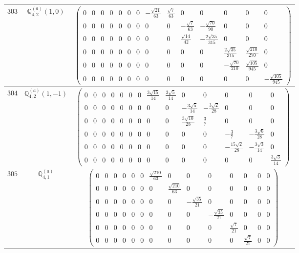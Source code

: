 \documentclass[fleqn,8pt,landscape]{jsarticle}
\begin{document}
\begin{center}
\begin{longtable}{ccc}
$ 303 $ & $ \mathbb{Q}_{4,2}^{(a)}(1,0) $ & $ \begin{pmatrix} 0 & 0 & 0 & 0 & 0 & 0 & 0 & - \frac{\sqrt{21}}{63} & \frac{\sqrt{7}}{63} & 0 & 0 & 0 & 0 & 0 \\ 0 & 0 & 0 & 0 & 0 & 0 & 0 & 0 & 0 & - \frac{\sqrt{7}}{63} & - \frac{\sqrt{70}}{90} & 0 & 0 & 0 \\ 0 & 0 & 0 & 0 & 0 & 0 & 0 & 0 & 0 & \frac{\sqrt{14}}{42} & - \frac{2 \sqrt{35}}{315} & 0 & 0 & 0 \\ 0 & 0 & 0 & 0 & 0 & 0 & 0 & 0 & 0 & 0 & 0 & \frac{2 \sqrt{35}}{315} & \frac{\sqrt{210}}{270} & 0 \\ 0 & 0 & 0 & 0 & 0 & 0 & 0 & 0 & 0 & 0 & 0 & - \frac{\sqrt{70}}{210} & \frac{\sqrt{105}}{945} & 0 \\ 0 & 0 & 0 & 0 & 0 & 0 & 0 & 0 & 0 & 0 & 0 & 0 & 0 & - \frac{\sqrt{105}}{945} \end{pmatrix} $ \\ \hline
$ 304 $ & $ \mathbb{Q}_{4,2}^{(a)}(1,-1) $ & $ \begin{pmatrix} 0 & 0 & 0 & 0 & 0 & 0 & 0 & \frac{3 \sqrt{15}}{14} & \frac{3 \sqrt{5}}{14} & 0 & 0 & 0 & 0 & 0 \\ 0 & 0 & 0 & 0 & 0 & 0 & 0 & 0 & 0 & - \frac{3 \sqrt{5}}{14} & - \frac{3 \sqrt{2}}{28} & 0 & 0 & 0 \\ 0 & 0 & 0 & 0 & 0 & 0 & 0 & 0 & 0 & \frac{3 \sqrt{10}}{28} & \frac{3}{7} & 0 & 0 & 0 \\ 0 & 0 & 0 & 0 & 0 & 0 & 0 & 0 & 0 & 0 & 0 & - \frac{3}{7} & - \frac{3 \sqrt{6}}{28} & 0 \\ 0 & 0 & 0 & 0 & 0 & 0 & 0 & 0 & 0 & 0 & 0 & - \frac{15 \sqrt{2}}{28} & - \frac{3 \sqrt{3}}{14} & 0 \\ 0 & 0 & 0 & 0 & 0 & 0 & 0 & 0 & 0 & 0 & 0 & 0 & 0 & \frac{3 \sqrt{3}}{14} \end{pmatrix} $ \\ \hline
$ 305 $ & $ \mathbb{Q}_{4,1}^{(a)} $ & $ \begin{pmatrix} 0 & 0 & 0 & 0 & 0 & 0 & \frac{\sqrt{210}}{63} & 0 & 0 & 0 & 0 & 0 & 0 & 0 \\ 0 & 0 & 0 & 0 & 0 & 0 & 0 & \frac{\sqrt{210}}{63} & 0 & 0 & 0 & 0 & 0 & 0 \\ 0 & 0 & 0 & 0 & 0 & 0 & 0 & 0 & - \frac{\sqrt{35}}{21} & 0 & 0 & 0 & 0 & 0 \\ 0 & 0 & 0 & 0 & 0 & 0 & 0 & 0 & 0 & - \frac{\sqrt{35}}{21} & 0 & 0 & 0 & 0 \\ 0 & 0 & 0 & 0 & 0 & 0 & 0 & 0 & 0 & 0 & \frac{\sqrt{7}}{21} & 0 & 0 & 0 \\ 0 & 0 & 0 & 0 & 0 & 0 & 0 & 0 & 0 & 0 & 0 & \frac{\sqrt{7}}{21} & 0 & 0 \end{pmatrix} $ \\ \hline

\end{longtable}
\end{center}
\end{document}
